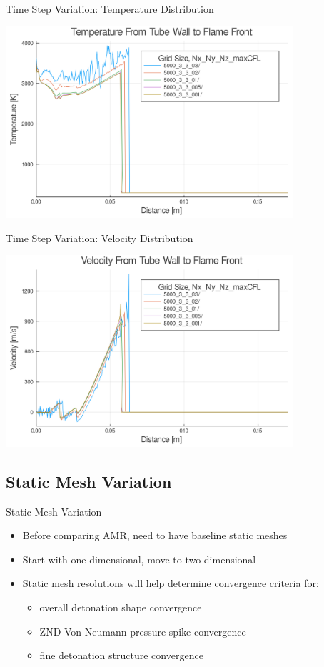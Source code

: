 \begin{frame}{Time Step Variation: Temperature Distribution}
\begin{center}
\includegraphics[width=0.8\textwidth]{../figs/cfl_test/t.png}
\end{center}
\end{frame}

\begin{frame}{Time Step Variation: Velocity Distribution}
\begin{center}
\includegraphics[width=0.8\textwidth]{../figs/cfl_test/u.png}
\end{center}
\end{frame}

\subsection{Static Mesh Variation}

\begin{frame}{Static Mesh Variation}
\begin{itemize}
\item Before comparing AMR, need to have baseline static meshes 
\item Start with one-dimensional, move to two-dimensional 
\item Static mesh resolutions will help determine convergence criteria for:
\begin{itemize}
    \item overall detonation shape convergence 
    \item ZND Von Neumann pressure spike convergence 
    \item fine detonation structure convergence
\end{itemize}
\end{itemize}
\end{frame}

